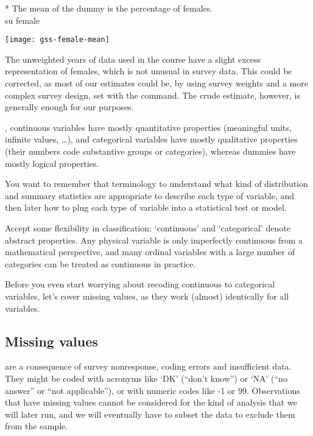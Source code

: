 \begin{description}
	\begin{docspec}
		* The mean of the dummy is the percentage of females.\\
		su female
	\end{docspec}

	\texttt{[image: gss-female-mean]}
	
	The unweighted years of \GSS data used in the course have a slight excess representation of females, which is not unusual in survey data. This could be corrected, as most of our estimates could be, by using survey weights and a more complex survey design, set with the  command. The crude estimate, however, is generally enough for our purposes.\\[1em]

\end{description}

, continuous variables have mostly quantitative properties (meaningful units, infinite values, …), and categorical variables have mostly qualitative properties (their numbers code substantive groups or categories), whereas dummies have mostly logical properties.

You want to remember that terminology to understand what kind of distribution and summary statistics are appropriate to describe each type of variable, and then later how to plug each type of variable into a statistical test or model.

Accept some flexibility in classification: `continuous' and `categorical' denote abstract properties. Any physical variable is only imperfectly continuous from a mathematical perspective, and many ordinal variables with a large number of categories can be treated as continuous in practice.

Before you even start worrying about recoding continuous to categorical variables, let's cover missing values, as they work (almost) identically for all variables.

%
%
%
\subsection{Missing values}
\label{sec:missing-values}

 are a consequence of survey nonresponse, coding errors and insufficient data. They might be coded with acronyms like `DK' (``don't know'') or `NA' (``no answer'' or ``not applicable''), or with numeric codes like -1 or 99. Observations that have missing values cannot be considered for the kind of analysis that we will later run, and we will eventually have to subset the data to exclude them from the sample.

